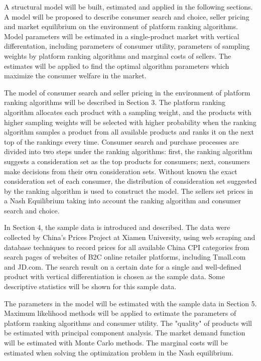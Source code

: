 \documentclass{article}
\begin{document}
A structural model will be built, estimated and applied in the following sections. A model will be proposed to describe consumer search and choice, seller pricing and market equilibrium on the environment of platform ranking algorithms. Model parameters will be estimated in a single-product market with vertical differentation, including parameters of consumer utility, parameters of sampling weights by platform ranking algorithms and marginal costs of sellers. The estimates will be applied to find the optimal algorithm parameters which maximize the consumer welfare in the market.  

The model of consumer search and seller pricing in the environment of platform ranking algorithms will be described in Section 3. The platform ranking algorithm allocates each product with a sampling weight, and the products with higher sampling weights will be selected with higher probability when the ranking algorithm samples a product from all available products and ranks it on the next top of the rankings every time. Consumer search and purchase processes are divided into two steps under the ranking algorithms: first, the ranking algorithm suggests a consideration set as the top products for consumers; next, consumers make decisions from their own consideration sets. Without known the exact consideration set of each consumer, the distribution of consideration set suggested by the ranking algorithm is used to construct the model. The sellers set prices in a Nash Equilibrium taking into account the ranking algorithm and consumer search and choice. 

In Section 4, the sample data is introduced and described. The data were collected by China's Prices Project at Xiamen University, using web scraping and database techniques to record prices for all available China CPI categories from search pages of websites of B2C online retailer platforms, including Tmall.com and JD.com. The search result on a certain date for a single and well-defined product with vertical differentiation is chosen as the sample data. Some descriptive statistics will be shown for this sample data. 

The parameters in the model will be estimated with the sample data in Section 5. Maximum likelihood methods will be applied to estimate the parameters of platform ranking algorithms and consumer utility. The "quality" of products will be estimated with principal component analysis. The market demand function will be estimated with Monte Carlo methods. The marginal costs will be estimated  when solving the optimization problem in the Nash equilibrium. 
\end{document}
